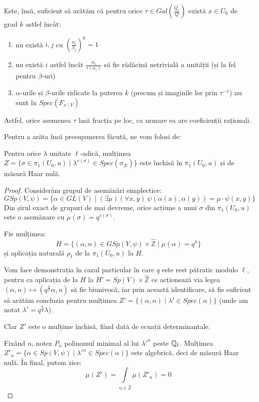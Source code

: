 \documentclass[13pt,openany,oneside]{book}
\begin{document}
Este, însă, suficient să arătăm că pentru orice $\tau \in Gal(\frac{\overline{Q_\ell}}{Q})$ există $x \in U_0$ de grad $k$ astfel încât:
\begin{enumerate}
\item nu există $i,j$ cu $(\frac{\alpha_i}{\beta_j})^k=1$
\item nu există $i$ astfel încât $\frac{\alpha_i}{\tau(\alpha_i)}$ să fie rădăcină netrivială a unității (și la fel pentru $\beta$-uri)
\item $\alpha$-urile și $\beta$-urile ridicate la puterea $k$ (precum și imaginile lor prin $\tau^{-1}$) nu sunt în $Spec(F_{x\mid V})$
\end{enumerate}
Astfel, orice asemenea $\tau$ lasă fracția pe loc, ca urmare ea are coeficienții raționali.

Pentru a arăta însă presupunerea făcută, ne vom folosi de:

\begin{prop}
Pentru orice $\lambda$ unitate $\ell$-adică, mulțimea $Z=\{\sigma \in \pi_1(U_0,u) \mid \lambda^{v(\sigma)} \in Spec(\sigma_{\mid V})\}$ este închisă în $\pi_1(U_0,u)$ și de măsură Haar nulă.
\end{prop}

\begin{proof}
Considerăm grupul de asemănări simplectice:
$$GSp(V,\psi)=\{\alpha\in GL(V) \mid (\exists \mu)(\forall x,y)\  \psi(\alpha(x),\alpha(y))=\mu\cdot\psi(x,y)\}$$
Din șirul exact de grupuri de mai devreme, orice acțiune a unui $\sigma$ din $\pi_1(U_0,u)$ este o asemănare cu $\mu(\sigma)=q^{v(\sigma)}$.

Fie mulțimea:
$$H=\{(\alpha,n)\in GSp(V,\psi) \times \hat{\mathbb{Z}} \mid \mu(\alpha)=q^n\}$$
și aplicația naturală $\rho_1$ de la $\pi_1(U_0,u)$ la $H$.

Vom face demonstrația în cazul particular în care $q$ este rest pătratic modulo $\ell$, pentru ca aplicația de la $H$ la $H'=Sp(V) \times \hat{\mathbb{Z}}$ ce acționează via legea $(\alpha,n)\mapsto(q^{\frac{n}{2}}\alpha,n)$ să fie biunivocă, iar prin această identificare, să fie suficient să arătăm concluzia pentru mulțimea $Z'=\{(\alpha,n)\mid\lambda'\in Spec(\alpha)\}$ (unde am notat $\lambda'=q^{\frac{n}{2}}\lambda$).

Clar $Z'$ este o mulțime închisă, fiind dată de ecuații determinantale.

Fixând $n$, notez $P_n$ polinomul minimal al lui $\lambda'^n$ peste $\mathbb{Q}_\ell$. Mulțimea $Z'_n=\{\alpha\in Sp(V,\psi)\mid \lambda'^n \in Spec(\alpha)\}$ este algebrică, deci de măsură Haar nulă. În final, putem zice:
$$\mu(Z')=\int\limits_{n \in \hat{\mathbb{Z}}} \mu(Z'_n) = 0$$
\end{proof}
\end{document}
